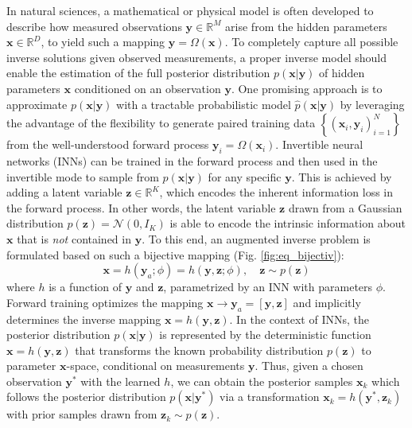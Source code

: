 \documentclass[letterpaper]{article}
\begin{document}
In natural sciences, a mathematical or physical model is often developed to describe how measured observations $\mathbf{y} \in \mathbb{R}^{M}$ arise from the hidden parameters $\mathbf{x} \in \mathbb{R}^D$, to yield such a mapping $\mathbf{y}=\Omega(\mathbf{x})$. To completely capture all possible inverse solutions given observed measurements, a proper inverse model should enable the estimation of the full posterior distribution $p(\mathbf{x}|\mathbf{y})$ of hidden parameters $\mathbf{x}$ conditioned on an observation $\mathbf{y}$. One promising approach is to approximate $p(\mathbf{x}|\mathbf{y})$ with a tractable probabilistic model $\hat{p}(\mathbf{x}|\mathbf{y})$ by leveraging the advantage of the flexibility to generate paired training data $\left\{(\mathbf{x}_i, \mathbf{y}_i)_{i=1}^N \right\}$ from the well-understood forward process $\mathbf{y}_i = \Omega(\mathbf{x}_i)$. Invertible neural networks (INNs) \citep{ rezende2015variational,dinh2016density,ardizzone2018analyzing} can be trained in the forward process and then used in the invertible mode to sample from $p(\mathbf{x}|\mathbf{y})$ for any specific $\mathbf{y}$. This is achieved by adding a latent variable $\mathbf{z} \in \mathbb{R}^K$, which encodes the inherent information loss in the forward process. In other words, the latent variable $\mathbf{z}$ drawn from a Gaussian distribution $p(\mathbf{z}) = \mathcal{N}(0,I_K)$ is able to encode the intrinsic information about $\mathbf{x}$ that is {\em not} contained in $\mathbf{y}$. To this end, an augmented inverse problem is formulated based on such a bijective mapping (Fig. \ref{fig:eq_bijectiv}):
\begin{equation}
    \mathbf{x} = h(\mathbf{y}_a; \phi) = h(\mathbf{y},\mathbf{z}; \phi), \quad \mathbf{z} \sim p(\mathbf{z}) \label{eq:bijective}
\end{equation}
where $h$ is a function of $\mathbf{y}$ and $\mathbf{z}$, parametrized by an INN with parameters $\phi$. Forward training optimizes the mapping $\mathbf{x} \rightarrow \mathbf{y}_a = [\mathbf{y}, \mathbf{z}]$ and implicitly determines the inverse mapping $\mathbf{x} = h(\mathbf{y},\mathbf{z})$. In the context of INNs, the posterior distribution $p(\mathbf{x}|\mathbf{y})$ is represented by the deterministic function $\mathbf{x}=h(\mathbf{y},\mathbf{z})$ that transforms the known probability distribution $p(\mathbf{z})$ to parameter $\mathbf{x}$-space, conditional on measurements $\mathbf{y}$. Thus, given a chosen observation $\mathbf{y}^*$ with the learned $h$, we can obtain the posterior samples $\mathbf{x}_k$ which follows the posterior distribution $p(\mathbf{x} | \mathbf{y}^*)$ via a transformation $\mathbf{x}_k = h(\mathbf{y}^*,\mathbf{z}_k)$ with prior samples drawn from $\mathbf{z}_k \sim p(\mathbf{z})$.
\end{document}
